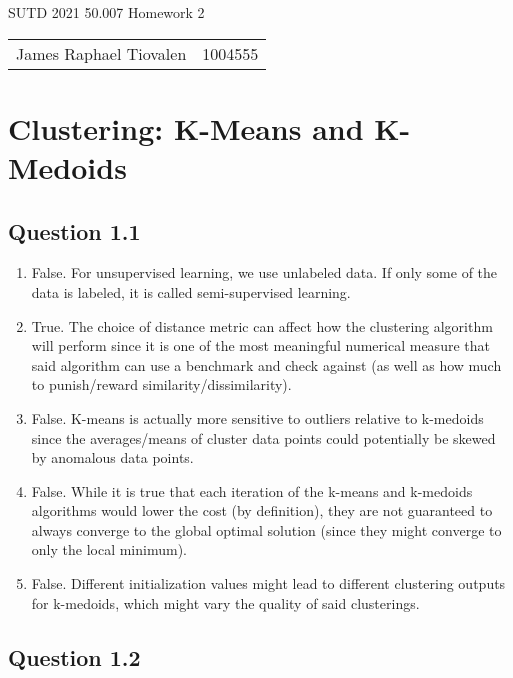 \documentclass[11pt,fancychapters]{article}
\begin{document}
\centerline{\huge{SUTD 2021 50.007 Homework 2}}

\begin{table}[ht]
\centering
\footnotesize
 \begin{tabular}{c c} 
James Raphael Tiovalen & 1004555
 \end{tabular}
\end{table}

\section{Clustering: K-Means and K-Medoids}

\subsection*{Question 1.1}

\begin{enumerate}[label=\textbf{\alph*)}]
	
\item False. For unsupervised learning, we use unlabeled data. If only some of the data is labeled, it is called semi-supervised learning.

\item True. The choice of distance metric can affect how the clustering algorithm will perform since it is one of the most meaningful numerical measure that said algorithm can use a benchmark and check against (as well as how much to punish/reward similarity/dissimilarity).

\item False. K-means is actually more sensitive to outliers relative to k-medoids since the averages/means of cluster data points could potentially be skewed by anomalous data points.

\item False. While it is true that each iteration of the k-means and k-medoids algorithms would lower the cost (by definition), they are not guaranteed to always converge to the global optimal solution (since they might converge to only the local minimum).

\item False. Different initialization values might lead to different clustering outputs for k-medoids, which might vary the quality of said clusterings.

\end{enumerate}

\subsection*{Question 1.2}
\end{document}
